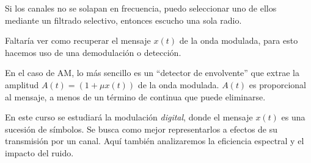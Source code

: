 \begin{figure}[htb]
\end{figure}
\FloatBarrier

Si los canales no se solapan en frecuencia, puedo seleccionar uno
de ellos mediante un filtrado selectivo, entonces escucho una sola
radio. 

Faltaría ver como recuperar el mensaje $x(t)$ de la onda modulada, para esto hacemos uso de una demodulación o detección.

En el caso de AM, lo más sencillo es un ``detector de envolvente''
que extrae la amplitud $A(t)=\left(1+\mu x(t)\right)$ de la onda
modulada. $A(t)$ es proporcional al mensaje, a menos de un
término de continua que puede eliminarse.

En este curso se estudiará la modulación \emph{digital},
donde el mensaje $x(t)$ es una sucesión de símbolos. Se busca como
mejor representarlos a efectos de su transmisión por un canal.
Aquí también analizaremos la eficiencia espectral y el impacto del
ruido.